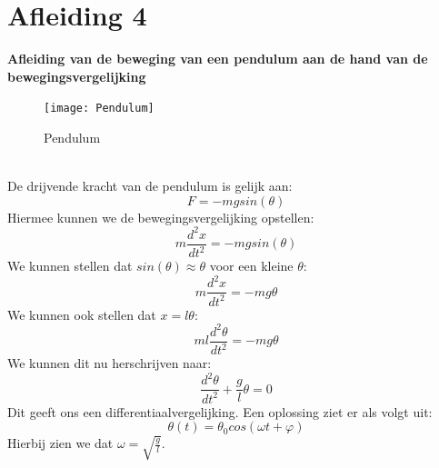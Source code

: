 \documentclass[a4paper,kul]{kulakarticle} %
\begin{document}
\section{Afleiding 4}
\textbf{Afleiding van de beweging van een pendulum aan de hand van de bewegingsvergelijking}
\begin{figure}[htbp]
	\centering
	\texttt{[image: Pendulum]}
	\caption[Pendulum]{Pendulum}
	\label{fig:pendulum}
\end{figure} \\
De drijvende kracht van de pendulum is gelijk aan:
\begin{equation*}
	F = -mg sin(\theta)
\end{equation*}
Hiermee kunnen we de bewegingsvergelijking opstellen:
\begin{equation*}
	m\frac{d^2x}{dt^2} = -mgsin(\theta)
\end{equation*}
We kunnen stellen dat $sin(\theta) \approx \theta$ voor een kleine $\theta$:
\begin{equation*}
	m\frac{d^2x}{dt^2} = -mg\theta
\end{equation*}
We kunnen ook stellen dat $x = l\theta$:
\begin{equation*}
	ml\frac{d^2\theta}{dt^2} = -mg\theta
\end{equation*}
We kunnen dit nu herschrijven naar:
\begin{equation*}
	\frac{d^2\theta}{dt^2} +\frac{g}{l}\theta = 0
\end{equation*}
Dit geeft ons een differentiaalvergelijking. Een oplossing ziet er als volgt uit:
\begin{equation*}
	\theta (t) = \theta_0 cos(\omega t +\varphi)
\end{equation*}
Hierbij zien we dat $\omega = \sqrt{\frac{g}{l}}$.
\newpage
\end{document}

